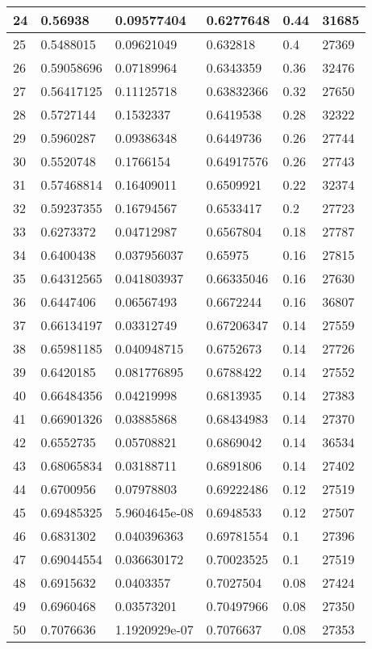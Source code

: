 \begin{longtable}{|l|l|l|l|l|l|}
24 & 0.56938 & 0.09577404 & 0.6277648 & 0.44 & 31685 \\ \hline 
25 & 0.5488015 & 0.09621049 & 0.632818 & 0.4 & 27369 \\ \hline 
26 & 0.59058696 & 0.07189964 & 0.6343359 & 0.36 & 32476 \\ \hline 
27 & 0.56417125 & 0.11125718 & 0.63832366 & 0.32 & 27650 \\ \hline 
28 & 0.5727144 & 0.1532337 & 0.6419538 & 0.28 & 32322 \\ \hline 
29 & 0.5960287 & 0.09386348 & 0.6449736 & 0.26 & 27744 \\ \hline 
30 & 0.5520748 & 0.1766154 & 0.64917576 & 0.26 & 27743 \\ \hline 
31 & 0.57468814 & 0.16409011 & 0.6509921 & 0.22 & 32374 \\ \hline 
32 & 0.59237355 & 0.16794567 & 0.6533417 & 0.2 & 27723 \\ \hline 
33 & 0.6273372 & 0.04712987 & 0.6567804 & 0.18 & 27787 \\ \hline 
34 & 0.6400438 & 0.037956037 & 0.65975 & 0.16 & 27815 \\ \hline 
35 & 0.64312565 & 0.041803937 & 0.66335046 & 0.16 & 27630 \\ \hline 
36 & 0.6447406 & 0.06567493 & 0.6672244 & 0.16 & 36807 \\ \hline 
37 & 0.66134197 & 0.03312749 & 0.67206347 & 0.14 & 27559 \\ \hline 
38 & 0.65981185 & 0.040948715 & 0.6752673 & 0.14 & 27726 \\ \hline 
39 & 0.6420185 & 0.081776895 & 0.6788422 & 0.14 & 27552 \\ \hline 
40 & 0.66484356 & 0.04219998 & 0.6813935 & 0.14 & 27383 \\ \hline 
41 & 0.66901326 & 0.03885868 & 0.68434983 & 0.14 & 27370 \\ \hline 
42 & 0.6552735 & 0.05708821 & 0.6869042 & 0.14 & 36534 \\ \hline 
43 & 0.68065834 & 0.03188711 & 0.6891806 & 0.14 & 27402 \\ \hline 
44 & 0.6700956 & 0.07978803 & 0.69222486 & 0.12 & 27519 \\ \hline 
45 & 0.69485325 & 5.9604645e-08 & 0.6948533 & 0.12 & 27507 \\ \hline 
46 & 0.6831302 & 0.040396363 & 0.69781554 & 0.1 & 27396 \\ \hline 
47 & 0.69044554 & 0.036630172 & 0.70023525 & 0.1 & 27519 \\ \hline 
48 & 0.6915632 & 0.0403357 & 0.7027504 & 0.08 & 27424 \\ \hline 
49 & 0.6960468 & 0.03573201 & 0.70497966 & 0.08 & 27350 \\ \hline 
50 & 0.7076636 & 1.1920929e-07 & 0.7076637 & 0.08 & 27353 \\ \hline 
\end{longtable}